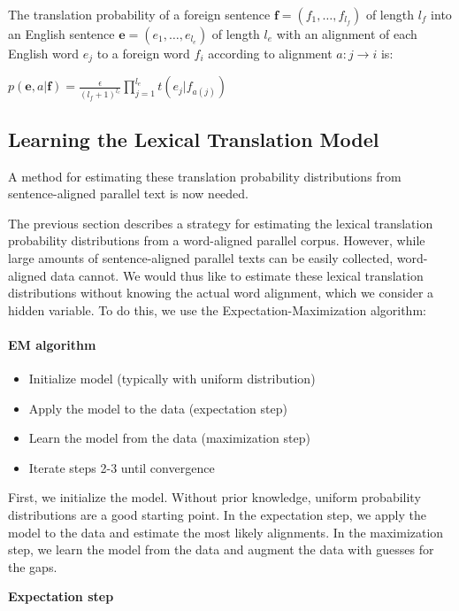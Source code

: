 \documentclass[10pt]{report}
\theoremstyle{plain}
\begin{document}
{The translation probability of a foreign sentence
$\textbf{f}=(f_1,\dots,f_{l_f})$ of length $l_f$ into an English
sentence $\textbf{e}=(e_1,\dots, e_{l_e})$ of length $l_e$ with an
alignment of each English word $e_j$ to a foreign word $f_i$
according to alignment $a:j \rightarrow i$ is:

\begin{center}
$p(\textbf{e},a|\textbf{f}) = \frac{\epsilon}{(l_f +
1)^{l_e}}\prod_{j=1}^{l_e} t(e_j|f_{a(j)})$
\end{center}


\subsection{Learning the Lexical Translation Model}

A method for estimating these translation probability distributions
from sentence-aligned parallel text is now needed.

The previous section describes a strategy for estimating the lexical
translation probability distributions from a word-aligned parallel
corpus. However, while large amounts of sentence-aligned parallel
texts can be easily collected, word-aligned data cannot. We would
thus like to estimate these lexical translation distributions
without knowing the actual word alignment, which we consider a
hidden variable. To do this, we use the Expectation-Maximization
algorithm:

\paragraph{EM algorithm}
\begin{itemize}
\item{Initialize model (typically with uniform distribution)}
\item{Apply the model to the data (expectation step)}
\item{Learn the model from the data (maximization step)}
\item{Iterate steps 2-3 until convergence}
\end{itemize}

First, we initialize the model. Without prior knowledge, uniform
probability distributions are a good starting point. In the
expectation step, we apply the model to the data and estimate the
most likely alignments. In the maximization step, we learn the model
from the data and augment the data with guesses for the gaps.

 \textbf{Expectation step\\}

}
\end{document}
